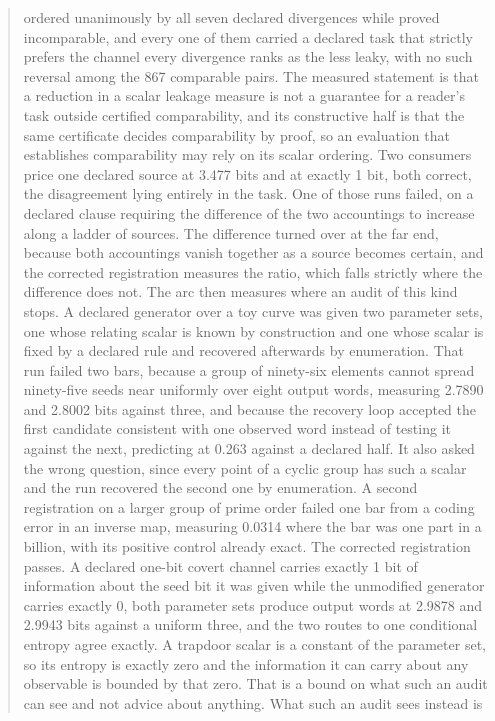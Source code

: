 \documentclass[aps,pre,reprint,nofootinbib]{revtex4-2}
\begin{document}
\begin{abstract}
ordered unanimously by all seven declared divergences while proved
incomparable, and every one of them carried a declared task that
strictly prefers the channel every divergence ranks as the less leaky,
with no such reversal among the 867 comparable
pairs.  The
measured statement is that a reduction in a scalar leakage measure is
not a guarantee for a reader's task outside certified comparability,
and its constructive half is that the same certificate decides
comparability by proof, so an evaluation that establishes
comparability may rely on its scalar ordering.  Two
consumers price one declared source at 3.477 bits and at exactly 1
bit, both correct, the disagreement lying entirely in the task.  One
of those runs failed, on a declared clause requiring the difference of
the two accountings to increase along a ladder of sources.  The difference
turned over at the far end, because both accountings vanish together
as a source becomes certain, and the corrected registration measures
the ratio, which falls strictly where the difference does not.
The arc then measures where an audit of this kind stops.  A declared
generator over a toy curve was given two parameter sets, one whose
relating scalar is known by construction and one whose scalar is
fixed by a declared rule and recovered afterwards by enumeration.
That run failed two bars, because a group of ninety-six elements
cannot spread ninety-five seeds near uniformly over eight output
words, measuring 2.7890 and 2.8002 bits against three, and because the
recovery loop accepted the first candidate consistent with one
observed word instead of testing it against the next, predicting at
0.263 against a declared half.  It also asked the wrong question,
since every point of a cyclic group has such a scalar and the run
recovered the second one by enumeration.
A second registration on a larger group of prime order failed
one bar from a coding error in an inverse map, measuring 0.0314 where
the bar was one part in a billion, with its positive control already
exact.  The corrected registration passes.  A declared one-bit covert
channel carries exactly 1 bit of information about the seed bit it was
given while the unmodified generator carries exactly 0, both parameter
sets produce output words at 2.9878 and 2.9943 bits against a uniform
three, and the two routes to one conditional entropy agree exactly.  A
trapdoor scalar is a constant of the parameter set, so its entropy is
exactly zero and the information it can carry about any observable is
bounded by that zero.  That is a bound on what such an audit can see
and not advice about anything.  What such an audit sees instead is

\end{abstract}
\end{document}

